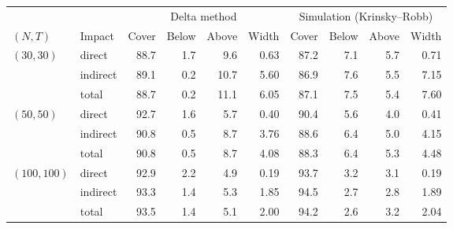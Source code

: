 \begin{tabular}{llrrrrrrrr}
\toprule
 & & \multicolumn{4}{c}{Delta method} & \multicolumn{4}{c}{Simulation (Krinsky--Robb)} \\
\cmidrule(lr){3-6}\cmidrule(lr){7-10}
$(N,T)$ & Impact & Cover & Below & Above & Width & Cover & Below & Above & Width \\
\midrule
$(30,30)$ & direct & 88.7 & 1.7 & 9.6 & 0.63 & 87.2 & 7.1 & 5.7 & 0.71 \\
 & indirect & 89.1 & 0.2 & 10.7 & 5.60 & 86.9 & 7.6 & 5.5 & 7.15 \\
 & total & 88.7 & 0.2 & 11.1 & 6.05 & 87.1 & 7.5 & 5.4 & 7.60 \\
\addlinespace
$(50,50)$ & direct & 92.7 & 1.6 & 5.7 & 0.40 & 90.4 & 5.6 & 4.0 & 0.41 \\
 & indirect & 90.8 & 0.5 & 8.7 & 3.76 & 88.6 & 6.4 & 5.0 & 4.15 \\
 & total & 90.8 & 0.5 & 8.7 & 4.08 & 88.3 & 6.4 & 5.3 & 4.48 \\
\addlinespace
$(100,100)$ & direct & 92.9 & 2.2 & 4.9 & 0.19 & 93.7 & 3.2 & 3.1 & 0.19 \\
 & indirect & 93.3 & 1.4 & 5.3 & 1.85 & 94.5 & 2.7 & 2.8 & 1.89 \\
 & total & 93.5 & 1.4 & 5.1 & 2.00 & 94.2 & 2.6 & 3.2 & 2.04 \\
\bottomrule
\end{tabular}
